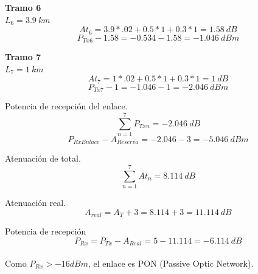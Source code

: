 \documentclass[12pt,letterpaper]{article}
\begin{document}
\textbf{Tramo 6} \\
$L_6=3.9 \ km$
\\
\begin{equation}
    At_6=3.9*.02+0.5*1+0.3*1=1.58 \ dB
\end{equation}
\begin{equation}
    P_{Tx6}-1.58=-0.534-1.58=-1.046 \ dBm
\end{equation}

\textbf{Tramo 7} \\
$L_7=1 \ km$
\\ 
\begin{equation}
    At_7=1*.02+0.5*1+0.3*1=1 \ dB
\end{equation}
\begin{equation}
    P_{Tx7}-1=-1.046-1=-2.046 \ dBm
\end{equation}

Potencia de recepción del enlace.
\begin{equation}
    \sum_{n=1}^{7} P_{Txn} = -2.046 \ dB
\end{equation}
\begin{equation}
    P_{RxEnlace}-A_{Reserva}=-2.046-3=-5.046 \ dBm
\end{equation}

Atenuación de total.
\begin{equation}
    \sum_{n=1}^{7} At_n = 8.114 \ dB
\end{equation}

Atenuación real.
\begin{equation}
    A_{real}=A_T+3=8.114+3=11.114 \ dB
\end{equation}

Potencia de recepción
\begin{equation}
    P_{Rx}=P_{Tx}-A_{Real}=5-11.114=-6.114 \ dB
\end{equation}
\\
Como $P_{Rx}>-16dBm$, el enlace es PON (Passive Optic Network).

\newpage
\end{document}
